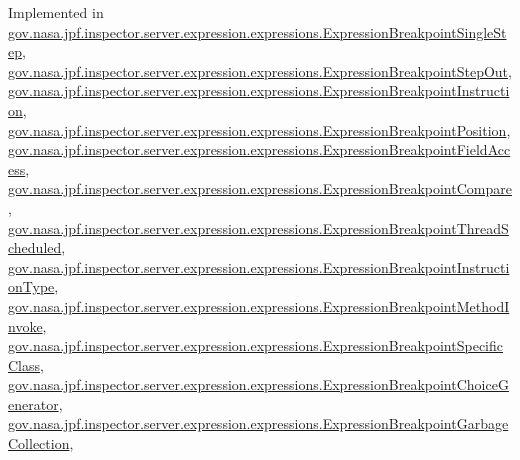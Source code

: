 Implemented in \hyperlink{classgov_1_1nasa_1_1jpf_1_1inspector_1_1server_1_1expression_1_1expressions_1_1_expression_breakpoint_single_step_a1c1441ec9e9ff70bac9aac05167bd584}{gov.\+nasa.\+jpf.\+inspector.\+server.\+expression.\+expressions.\+Expression\+Breakpoint\+Single\+Step}, \hyperlink{classgov_1_1nasa_1_1jpf_1_1inspector_1_1server_1_1expression_1_1expressions_1_1_expression_breakpoint_step_out_a5191d503e83a717fff835114b6e7b7e8}{gov.\+nasa.\+jpf.\+inspector.\+server.\+expression.\+expressions.\+Expression\+Breakpoint\+Step\+Out}, \hyperlink{classgov_1_1nasa_1_1jpf_1_1inspector_1_1server_1_1expression_1_1expressions_1_1_expression_breakpoint_instruction_a533e24731f0a1632b0cf2d1125e82905}{gov.\+nasa.\+jpf.\+inspector.\+server.\+expression.\+expressions.\+Expression\+Breakpoint\+Instruction}, \hyperlink{classgov_1_1nasa_1_1jpf_1_1inspector_1_1server_1_1expression_1_1expressions_1_1_expression_breakpoint_position_a52a8a727b070e56dba38a34960beecf4}{gov.\+nasa.\+jpf.\+inspector.\+server.\+expression.\+expressions.\+Expression\+Breakpoint\+Position}, \hyperlink{classgov_1_1nasa_1_1jpf_1_1inspector_1_1server_1_1expression_1_1expressions_1_1_expression_breakpoint_field_access_a0c9540df5151b567929d50b6e3260aba}{gov.\+nasa.\+jpf.\+inspector.\+server.\+expression.\+expressions.\+Expression\+Breakpoint\+Field\+Access}, \hyperlink{classgov_1_1nasa_1_1jpf_1_1inspector_1_1server_1_1expression_1_1expressions_1_1_expression_breakpoint_compare_a9d73dc0b03cfdca585195c99a8c14b8f}{gov.\+nasa.\+jpf.\+inspector.\+server.\+expression.\+expressions.\+Expression\+Breakpoint\+Compare}, \hyperlink{classgov_1_1nasa_1_1jpf_1_1inspector_1_1server_1_1expression_1_1expressions_1_1_expression_breakpoint_thread_scheduled_ac02b6383a2918d35d4307c4c0f2d58be}{gov.\+nasa.\+jpf.\+inspector.\+server.\+expression.\+expressions.\+Expression\+Breakpoint\+Thread\+Scheduled}, \hyperlink{classgov_1_1nasa_1_1jpf_1_1inspector_1_1server_1_1expression_1_1expressions_1_1_expression_breakpoint_instruction_type_aefb559d1692a086952cd87a970297867}{gov.\+nasa.\+jpf.\+inspector.\+server.\+expression.\+expressions.\+Expression\+Breakpoint\+Instruction\+Type}, \hyperlink{classgov_1_1nasa_1_1jpf_1_1inspector_1_1server_1_1expression_1_1expressions_1_1_expression_breakpoint_method_invoke_ab1b03a2edbdb645b34769e1b8a469e81}{gov.\+nasa.\+jpf.\+inspector.\+server.\+expression.\+expressions.\+Expression\+Breakpoint\+Method\+Invoke}, \hyperlink{classgov_1_1nasa_1_1jpf_1_1inspector_1_1server_1_1expression_1_1expressions_1_1_expression_breakpoint_specific_class_a190bc3c6dce186848caa73e464aaf4f8}{gov.\+nasa.\+jpf.\+inspector.\+server.\+expression.\+expressions.\+Expression\+Breakpoint\+Specific\+Class}, \hyperlink{classgov_1_1nasa_1_1jpf_1_1inspector_1_1server_1_1expression_1_1expressions_1_1_expression_breakpoint_choice_generator_a6f5e7b1b6f270c86126c05bf98949507}{gov.\+nasa.\+jpf.\+inspector.\+server.\+expression.\+expressions.\+Expression\+Breakpoint\+Choice\+Generator}, \hyperlink{classgov_1_1nasa_1_1jpf_1_1inspector_1_1server_1_1expression_1_1expressions_1_1_expression_breakpoint_garbage_collection_ac580d4b72f0db128201174bc08ebbadc}{gov.\+nasa.\+jpf.\+inspector.\+server.\+expression.\+expressions.\+Expression\+Breakpoint\+Garbage\+Collection}, 